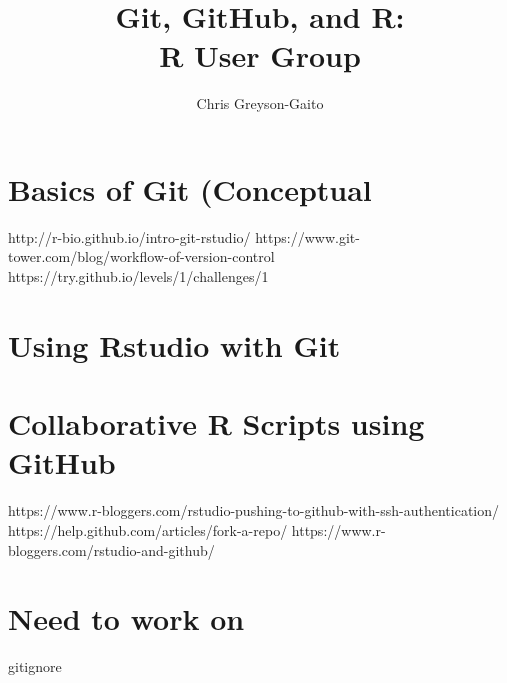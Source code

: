 \documentclass[12pt,letterpaper]{article} %
\begin{document}
\title{Git, GitHub, and R:\\ R User Group}
\author{Chris Greyson-Gaito}
\date{}
\maketitle
\section*{Basics of Git (Conceptual}
http://r-bio.github.io/intro-git-rstudio/
https://www.git-tower.com/blog/workflow-of-version-control
https://try.github.io/levels/1/challenges/1

\section*{Using Rstudio with Git}



\section*{Collaborative R Scripts using GitHub}
https://www.r-bloggers.com/rstudio-pushing-to-github-with-ssh-authentication/
https://help.github.com/articles/fork-a-repo/
https://www.r-bloggers.com/rstudio-and-github/
\section*{Need to work on}
gitignore
\end{document}
